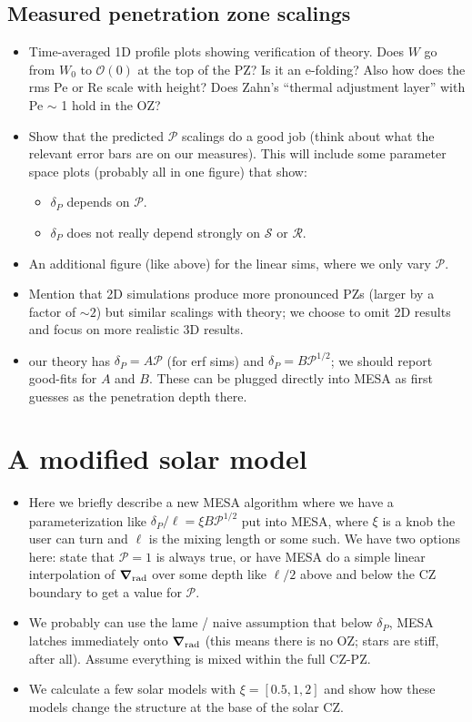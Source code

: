 \documentclass[12pt, fullpage]{article}
\renewcommand{\vec}[1]{\boldsymbol{#1}}
\newcommand{\grad}{\vec{\nabla}}
\begin{document}
\subsection{Measured penetration zone scalings}
\begin{itemize}
\item Time-averaged 1D profile plots showing verification of theory.
Does $W$ go from $W_0$ to $\mathcal{O}(0)$ at the top of the PZ?
Is it an e-folding?
Also how does the rms Pe or Re scale with height?
Does Zahn's ``thermal adjustment layer'' with Pe $\sim$ 1 hold in the OZ?
\item Show that the predicted $\mathcal{P}$ scalings do a good job (think about what the relevant error bars are on our measures).
This will include some parameter space plots (probably all in one figure) that show:
\begin{itemize}
\item $\delta_P$ depends on $\mathcal{P}$.
\item $\delta_P$ does not really depend strongly on $\mathcal{S}$ or $\mathcal{R}$.
\end{itemize}
\item An additional figure (like above) for the linear sims, where we only vary $\mathcal{P}$.
\item Mention that 2D simulations produce more pronounced PZs (larger by a factor of $\sim 2$) but similar scalings with theory; we choose to omit 2D results and focus on more realistic 3D results.
\item our theory has $\delta_P = A \mathcal{P}$ (for erf sims) and $\delta_P = B \mathcal{P}^{1/2}$; we should report good-fits for $A$ and $B$.
These can be plugged directly into MESA as first guesses as the penetration depth there.
\end{itemize}



\section{A modified solar model}
\begin{itemize}
\item Here we briefly describe a new MESA algorithm where we have a parameterization like $\delta_P/\ell = \xi B \mathcal{P}^{1/2}$ put into MESA, where $\xi$ is a knob the user can turn and $\ell$ is the mixing length or some such.
We have two options here: state that $\mathcal{P} = 1$ is always true, or have MESA do a simple linear interpolation of $\grad_{\rm{rad}}$ over some depth like $\ell/2$ above and below the CZ boundary to get a value for $\mathcal{P}$.
\item We probably can use the lame / naive assumption that below $\delta_P$, MESA latches immediately onto $\grad_{\rm{rad}}$ (this means there is no OZ; stars are stiff, after all).
Assume everything is mixed within the full CZ-PZ.
\item We calculate a few solar models with $\xi = [0.5, 1, 2]$ and show how these models change the structure at the base of the solar CZ.
\end{itemize}
\end{document}
